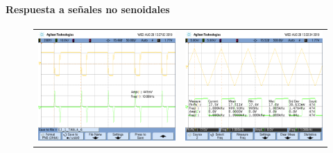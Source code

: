 \paragraph*{Respuesta a se\~nales no senoidales}

\begin{figure}[H]
	\centering
	\begin{tabular}{c c}
		\includegraphics[scale=0.2]{Derivador/Mediciones/Osciloscopio/PCB_Compensado/EJ_1_TABLA_6.png} &
		\includegraphics[scale=0.2]{Derivador/Mediciones/Osciloscopio/PCB_Compensado/osc_4.png} \\

\end{tabular}
\end{figure}
